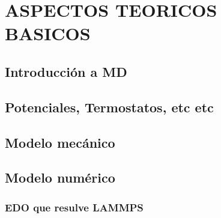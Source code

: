 
\chapter{ASPECTOS TEORICOS BASICOS} %

\label{C2} %



\section{Introducción a MD}
\label{S2_1}



\section{Potenciales, Termostatos, etc etc}
\label{S2_2}



\section{Modelo mecánico}
\label{S2_3}



\section{Modelo numérico}
\label{S2_4}



\subsection{EDO que resulve LAMMPS}
\label{S2_4_1}